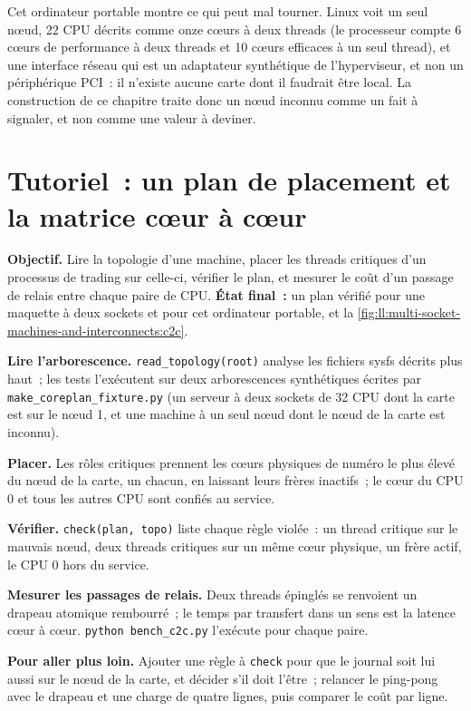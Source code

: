 Cet ordinateur portable montre ce qui peut mal tourner. Linux voit un seul nœud, 22 CPU décrits comme onze cœurs à deux threads (le processeur
compte 6 cœurs de performance à deux threads et 10 cœurs efficaces à un seul thread), et une interface réseau qui est un adaptateur
synthétique de l'hyperviseur, et non un périphérique PCI~: il n'existe aucune carte dont il faudrait être local. La construction de ce chapitre
traite donc un nœud inconnu comme un fait à signaler, et non comme une valeur à deviner.

\section{Tutoriel~: un plan de placement et la matrice cœur à cœur}\label{tut:ll:multi-socket-machines-and-interconnects:tut}

\begin{tutorial}
\textbf{Objectif.} Lire la topologie d'une machine, placer les threads critiques d'un processus de trading sur celle-ci, vérifier le plan, et mesurer
le coût d'un passage de relais entre chaque paire de CPU. \textbf{État final~:} un plan vérifié pour une maquette à deux sockets et pour
cet ordinateur portable, et la \cref{fig:ll:multi-socket-machines-and-interconnects:c2c}.
\begin{tutsteps}
\item \textbf{Lire l'arborescence.} \texttt{read\_topology(root)} analyse les fichiers sysfs décrits plus haut~; les tests l'exécutent sur deux
arborescences synthétiques écrites par \texttt{make\_coreplan\_fixture.py} (un serveur à deux sockets de 32 CPU dont la carte est sur le nœud 1, et une
machine à un seul nœud dont le nœud de la carte est inconnu).
\item \textbf{Placer.} Les rôles critiques prennent les cœurs physiques de numéro le plus élevé du nœud de la carte, un chacun, en laissant leurs
frères inactifs~; le cœur du CPU 0 et tous les autres CPU sont confiés au service.
\label{lst:ll:multi-socket-machines-and-interconnects:plan}
\item \textbf{Vérifier.} \texttt{check(plan, topo)} liste chaque règle violée~: un thread critique sur le mauvais nœud, deux threads critiques
sur un même cœur physique, un frère actif, le CPU 0 hors du service.
\item \textbf{Mesurer les passages de relais.} Deux threads épinglés se renvoient un drapeau atomique rembourré~; le temps par transfert
dans un sens est la latence cœur à cœur. \texttt{python bench\_c2c.py} l'exécute pour chaque paire.
\label{lst:ll:multi-socket-machines-and-interconnects:pingpong}
\end{tutsteps}
\textbf{Pour aller plus loin.} Ajouter une règle à \texttt{check} pour que le journal soit lui aussi sur le nœud de la carte, et décider
s'il doit l'être~; relancer le ping-pong avec le drapeau et une charge de quatre lignes, puis comparer le coût par ligne.
\end{tutorial}


